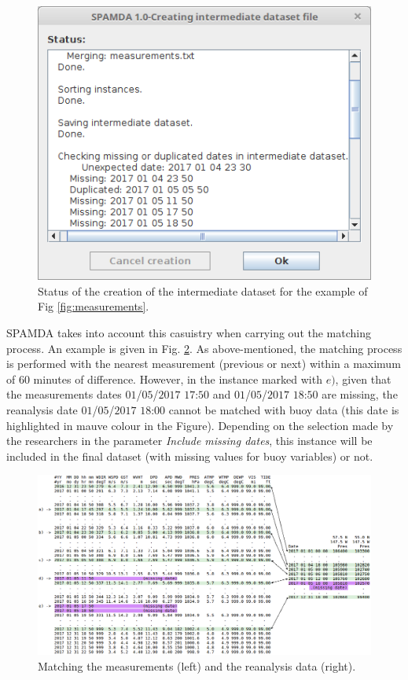 \documentclass[review]{elsarticle}
\begin{document}
		\begin{figure}[ht!]
			\centering
			\includegraphics[scale=0.40]{figures/FigureCreatingDataset.png}
			\caption{Status of the creation of the intermediate dataset for the example of Fig \ref{fig:measurements}.}
			\label{fig:creatingDataset}
		\end{figure}
		
		SPAMDA takes into account this casuistry when carrying out the matching process. An example is given in Fig. \ref{fig:matchingMeasurements}. As above-mentioned, the matching process is performed with the nearest measurement (previous or next) within a maximum of 60 minutes of difference. However, in the instance marked with $e)$, given that the measurements dates $01$/$05$/$2017$ $17$:$50$ and $01$/$05$/$2017$ $18$:$50$ are missing, the reanalysis date $01$/$05$/$2017$ $18$:$00$ cannot be matched with buoy data (this date is highlighted in mauve colour in the Figure). Depending on the selection made by the researchers in the parameter \textit{Include missing dates}, this instance will be included in the final dataset (with missing values for buoy variables) or not.
		
		\begin{figure}[ht!]
			\centering
			\includegraphics[scale=0.36]{figures/FigureMatchingMeasurements.png}
			\caption{Matching the measurements (left) and the reanalysis data (right).}
			\label{fig:matchingMeasurements}
		\end{figure}
\end{document}
